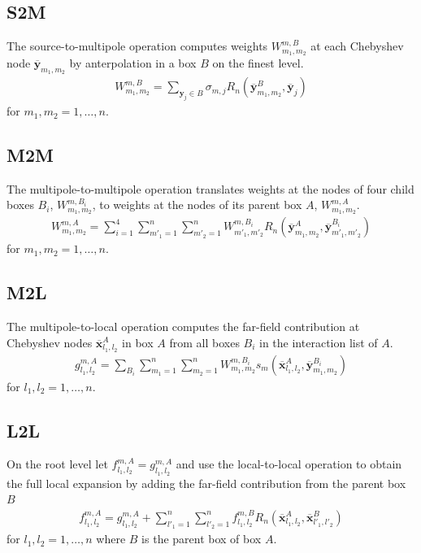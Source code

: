 \documentclass[11pt, oneside]{article}   	%
\begin{document}
\subsection{S2M}
The source-to-multipole operation computes weights $W^{m,B}_{m_1,m_2}$ at each Chebyshev node $\mathbf{\overline{y}}_{m_1,m_2}$ by anterpolation in a box $B$ on the finest level.
\begin{align}
W_{m_1,m_2}^{m,B} = \sum_{\mathbf{y}_j\in B} \sigma_{m,j} R_n(\mathbf{\overline{y}}^B_{m_1,m_2},\mathbf{\overline{y}}_j)
\end{align}
for $m_1,m_2 = 1,\dots,n$.
\subsection{M2M}
The multipole-to-multipole operation translates weights at the nodes of four child boxes $B_i$, $W_{m_1,m_2}^{m,B_i}$, to weights at the nodes of its parent box $A$, $W_{m_1,m_2}^{m,A}$.
\begin{align}
W_{m_1,m_2}^{m,A} = \sum_{i=1}^4 \sum_{m'_1=1}^n\sum_{m'_2=1}^n W_{m'_1,m'_2}^{m,B_i} R_n(\mathbf{\overline{y}}^A_{m_1,m_2},\mathbf{\overline{y}}^{B_i}_{m'_1,m'_2})
\end{align}
for $m_1,m_2= 1,\dots,n$.
\subsection{M2L}
The multipole-to-local operation computes the far-field contribution at Chebyshev nodes $\mathbf{\overline{x}}_{l_1,l_2}^A$ in box $A$ from all boxes $B_i$ in the interaction list of $A$.
\begin{align}
g_{l_1,l_2}^{m,A} = \sum_{B_i} \sum_{m_1=1}^n\sum_{m_2=1}^n W_{m_1,m_2}^{m,B_i} s_m(\mathbf{\overline{x}}^{A}_{l_1,l_2},\mathbf{\overline{y}}^{B_i}_{m_1,m_2})
\end{align}
for $l_1,l_2 = 1,\dots,n$.
\subsection{L2L}
On the root level let $f^{m,A}_{l_1,l_2}=g^{m,A}_{l_1,l_2}$ and use the local-to-local operation to obtain the full local expansion by adding the far-field contribution from the parent box $B$
\begin{align}
f^{m,A}_{l_1,l_2}=g^{m,A}_{l_1,l_2} + \sum_{l'_1=1}^n \sum_{l'_2=1}^n f^{m,B}_{l_1,l_2} R_n(\mathbf{\overline{x}}_{l_1,l_2}^A,\mathbf{\overline{x}}_{l'_1,l'_2}^B)
\end{align}
for $l_1,l_2 = 1,\dots,n$ where $B$ is the parent box of box $A$.
\end{document}

